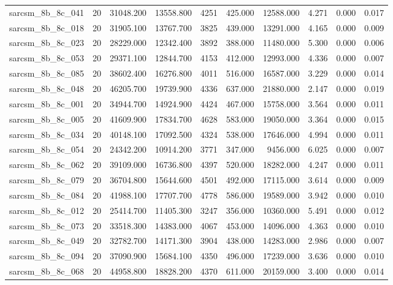 \begin{tabular}{lrrrrrrrrr}
sarcsm\_8b\_8c\_041 & 20 & 31048.200 & 13558.800 & 4251 & 425.000 & 12588.000 & 4.271 & 0.000 & 0.017 \\
sarcsm\_8b\_8c\_018 & 20 & 31905.100 & 13767.700 & 3825 & 439.000 & 13291.000 & 4.165 & 0.000 & 0.009 \\
sarcsm\_8b\_8c\_023 & 20 & 28229.000 & 12342.400 & 3892 & 388.000 & 11480.000 & 5.300 & 0.000 & 0.006 \\
sarcsm\_8b\_8c\_053 & 20 & 29371.100 & 12844.700 & 4153 & 412.000 & 12993.000 & 4.336 & 0.000 & 0.007 \\
sarcsm\_8b\_8c\_085 & 20 & 38602.400 & 16276.800 & 4011 & 516.000 & 16587.000 & 3.229 & 0.000 & 0.014 \\
sarcsm\_8b\_8c\_048 & 20 & 46205.700 & 19739.900 & 4336 & 637.000 & 21880.000 & 2.147 & 0.000 & 0.019 \\
sarcsm\_8b\_8c\_001 & 20 & 34944.700 & 14924.900 & 4424 & 467.000 & 15758.000 & 3.564 & 0.000 & 0.011 \\
sarcsm\_8b\_8c\_005 & 20 & 41609.900 & 17834.700 & 4628 & 583.000 & 19050.000 & 3.364 & 0.000 & 0.015 \\
sarcsm\_8b\_8c\_034 & 20 & 40148.100 & 17092.500 & 4324 & 538.000 & 17646.000 & 4.994 & 0.000 & 0.011 \\
sarcsm\_8b\_8c\_054 & 20 & 24342.200 & 10914.200 & 3771 & 347.000 & 9456.000 & 6.025 & 0.000 & 0.007 \\
sarcsm\_8b\_8c\_062 & 20 & 39109.000 & 16736.800 & 4397 & 520.000 & 18282.000 & 4.247 & 0.000 & 0.011 \\
sarcsm\_8b\_8c\_079 & 20 & 36704.800 & 15644.600 & 4501 & 492.000 & 17115.000 & 3.614 & 0.000 & 0.009 \\
sarcsm\_8b\_8c\_084 & 20 & 41988.100 & 17707.700 & 4778 & 586.000 & 19589.000 & 3.942 & 0.000 & 0.010 \\
sarcsm\_8b\_8c\_012 & 20 & 25414.700 & 11405.300 & 3247 & 356.000 & 10360.000 & 5.491 & 0.000 & 0.012 \\
sarcsm\_8b\_8c\_073 & 20 & 33518.300 & 14383.000 & 4067 & 453.000 & 14096.000 & 4.363 & 0.000 & 0.010 \\
sarcsm\_8b\_8c\_049 & 20 & 32782.700 & 14171.300 & 3904 & 438.000 & 14283.000 & 2.986 & 0.000 & 0.007 \\
sarcsm\_8b\_8c\_094 & 20 & 37090.900 & 15684.100 & 4350 & 496.000 & 17239.000 & 3.636 & 0.000 & 0.010 \\
sarcsm\_8b\_8c\_068 & 20 & 44958.800 & 18828.200 & 4370 & 611.000 & 20159.000 & 3.400 & 0.000 & 0.014 \\

\end{tabular}

